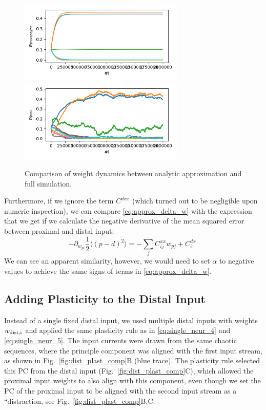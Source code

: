 \documentclass[10pt,a4paper]{article}
\newcommand{\avg}[1]{\langle #1 \rangle}
\begin{document}
\begin{figure}
\centering
\includegraphics[width=0.7\textwidth]{./figures/weights_analytic_comp.png}
\includegraphics[width=0.7\textwidth]{./figures/weights_full_sim_comp.png}
\caption{Comparison of weight dynamics between analytic approximation and full simulation.}
\label{fig:weight_dyn_analytic_comp}
\end{figure}

Furthermore, if we ignore the term $C^{dxx}$ (which turned out to be negligible upon numeric inspection), we can compare \eqref{eq:approx_delta_w} with the expression that we get if we calculate the negative derivative of the mean squared error between proximal and distal input:
\begin{equation}
-\partial_{w_{pi}} \frac{1}{2}\avg{\left( p - d \right)^2} = -\sum_j C^{xx}_{ij} w_{pj} + C^{dx}_i \;
\end{equation} 
We can see an apparent similarity, however, we would need to set $\alpha$ to negative values to achieve the same signs of terms in \eqref{eq:approx_delta_w}.

\subsection{Adding Plasticity to the Distal Input}

Instead of a single fixed distal input, we used multiple distal inputs with weights $w_{\rm dist, i}$ and applied the same plasticity rule as in \eqref{eq:single_neur_4} and \eqref{eq:single_neur_5}. The input currents were drawn from the same chaotic sequences, where the principle component was aligned with the first input stream, as shown in Fig.~\ref{fig:dist_plast_comp}B (blue trace). The plasticity rule selected this PC from the distal input (Fig.~\ref{fig:dist_plast_comp}C), which allowed the proximal input weights to also align with this component, even though we set the PC of the proximal input to be aligned with the second input stream as a ``distraction, see Fig.~\ref{fig:dist_plast_comp}B,C.
\end{document}

